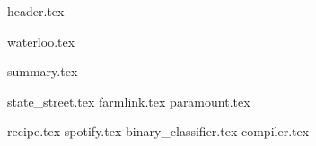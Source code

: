 \documentclass[11pt]{article}
\begin{document}
{header.tex}

{waterloo.tex}

{summary.tex}

{state_street.tex}
{farmlink.tex}
{paramount.tex}

{recipe.tex}
{spotify.tex}
{binary_classifier.tex}
{compiler.tex}

\end{document}
